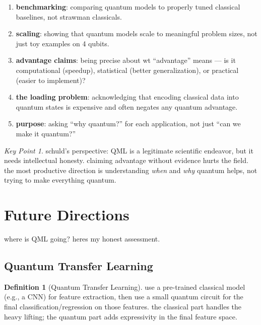 \documentclass[11pt,a4paper]{article}
\theoremstyle{definition}
\newtheorem{definition}{Definition}[section]
\theoremstyle{remark}
\newtheorem*{keypoint}{Key Point}
\begin{document}
\begin{enumerate}[label=\arabic*.]
    \item \textbf{benchmarking}: comparing quantum models to properly tuned classical baselines, not strawman classicals.

    \item \textbf{scaling}: showing that quantum models scale to meaningful problem sizes, not just toy examples on 4 qubits.

    \item \textbf{advantage claims}: being precise about wt ``advantage'' means --- is it computational (speedup), statistical (better generalization), or practical (easier to implement)?

    \item \textbf{the loading problem}: acknowledging that encoding classical data into quantum states is expensive and often negates any quantum advantage.

    \item \textbf{purpose}: asking ``why quantum?'' for each application, not just ``can we make it quantum?''
\end{enumerate}

\begin{keypoint}
schuld's perspective: QML is a legitimate scientific endeavor, but it needs intellectual honesty. claiming advantage without evidence hurts the field. the most productive direction is understanding \emph{when} and \emph{why} quantum helps, not trying to make everything quantum.
\end{keypoint}

\section{Future Directions}

where is QML going? heres my honest assessment.

\subsection{Quantum Transfer Learning}

\begin{definition}[Quantum Transfer Learning]
use a pre-trained classical model (e.g., a CNN) for feature extraction, then use a small quantum circuit for the final classification/regression on those features. the classical part handles the heavy lifting; the quantum part adds expressivity in the final feature space.
\end{definition}
\end{document}
